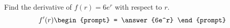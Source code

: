 \documentclass{ximera}
\author{Gregory Hartman \and Matthew Carr}
\begin{document}
\begin{exercise}



Find the derivative of $f(r)=6e^r$ with respect to $r$.
\[
f'(r)
\begin{prompt} 
= \answer{6e^r}
\end{prompt}
\]

\end{exercise}
\end{document}
